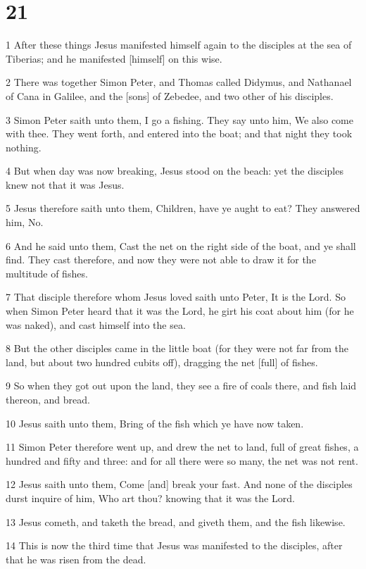 \chapter{21}

\par 1 After these things Jesus manifested himself again to the disciples at the sea of Tiberias; and he manifested [himself] on this wise.
\par 2 There was together Simon Peter, and Thomas called Didymus, and Nathanael of Cana in Galilee, and the [sons] of Zebedee, and two other of his disciples.
\par 3 Simon Peter saith unto them, I go a fishing. They say unto him, We also come with thee. They went forth, and entered into the boat; and that night they took nothing.
\par 4 But when day was now breaking, Jesus stood on the beach: yet the disciples knew not that it was Jesus.
\par 5 Jesus therefore saith unto them, Children, have ye aught to eat? They answered him, No.
\par 6 And he said unto them, Cast the net on the right side of the boat, and ye shall find. They cast therefore, and now they were not able to draw it for the multitude of fishes.
\par 7 That disciple therefore whom Jesus loved saith unto Peter, It is the Lord. So when Simon Peter heard that it was the Lord, he girt his coat about him (for he was naked), and cast himself into the sea.
\par 8 But the other disciples came in the little boat (for they were not far from the land, but about two hundred cubits off), dragging the net [full] of fishes.
\par 9 So when they got out upon the land, they see a fire of coals there, and fish laid thereon, and bread.
\par 10 Jesus saith unto them, Bring of the fish which ye have now taken.
\par 11 Simon Peter therefore went up, and drew the net to land, full of great fishes, a hundred and fifty and three: and for all there were so many, the net was not rent.
\par 12 Jesus saith unto them, Come [and] break your fast. And none of the disciples durst inquire of him, Who art thou? knowing that it was the Lord.
\par 13 Jesus cometh, and taketh the bread, and giveth them, and the fish likewise.
\par 14 This is now the third time that Jesus was manifested to the disciples, after that he was risen from the dead.
